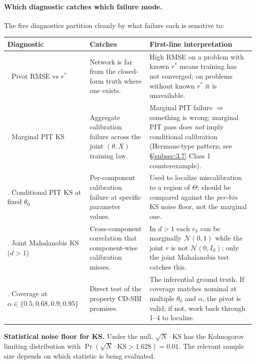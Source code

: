 \documentclass[11pt]{article}
\begin{document}
\paragraph{Which diagnostic catches which failure mode.}
The five diagnostics partition cleanly by what failure each is
sensitive to:

\begin{longtable}[]{@{}
  >{\raggedright\arraybackslash}p{}
  >{\raggedright\arraybackslash}p{}
  >{\raggedright\arraybackslash}p{}@{}}
\toprule\noalign{}
Diagnostic & Catches & First-line interpretation \\
\midrule\noalign{}
\endhead
\bottomrule\noalign{}
\endlastfoot
1. Pivot RMSE vs \(r^*\) & Network is far from the closed-form truth
where one exists. & High RMSE on a problem with known \(r^*\) means
training has not converged; on problems without known \(r^*\) it is
unavailable. \\
2. Marginal PIT KS & Aggregate calibration failure across the joint
\((\theta, X)\) training law. & Marginal PIT failure $\Rightarrow$
something is wrong; marginal PIT pass does \emph{not} imply
conditional calibration (Hermans-type pattern; see \S\ref{subsec:3.7}
Class 1 counterexample). \\
3. Conditional PIT KS at fixed \(\theta_0\) & Per-component calibration
failure at specific parameter values. & Used to localize miscalibration
to a region of \(\Theta\); should be compared against the
\emph{per-bin} KS noise floor, not the marginal one. \\
4. Joint Mahalanobis KS (\(d > 1\)) & Cross-component correlation that
component-wise calibration misses. & In \(d > 1\) each \(r_k\) can be
marginally \(\mathcal{N}(0, 1)\) while the joint \(r\) is not
\(\mathcal{N}(0, I_d)\); only the joint Mahalanobis test catches this. \\
5. Coverage at \(\alpha \in \{0.5, 0.68, 0.9, 0.95\}\) & Direct test of
the property CD-SBI promises. & The inferential ground truth. If
coverage matches nominal at multiple \(\theta_0\) and \(\alpha\), the
pivot is valid; if not, work back through 1--4 to localize. \\
\end{longtable}

\textbf{Statistical noise floor for KS.} Under the null,
\(\sqrt{N} \cdot \mathrm{KS}\) has the Kolmogorov limiting distribution
\citep[\S14.2]{LehmannRomano2005} with
\(\Pr(\sqrt{N}\cdot\mathrm{KS} > 1.628) = 0.01\). The relevant
sample size depends on which statistic is being evaluated.
\end{document}
